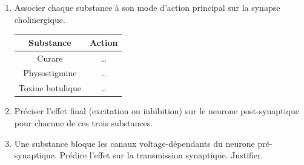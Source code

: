 \documentclass[11pt]{article}
\begin{document}
\begin{exercice}
\begin{enumerate}
    \item Associer chaque substance à son mode d'action principal sur la synapse cholinergique.
    \begin{center}
        \begin{tabular}{|c|c|}
        \hline
        \textbf{Substance} & \textbf{Action} \\
        \hline
        Curare & \ldots \\
        \hline
        Physostigmine & \ldots \\
        \hline
        Toxine botulique & \ldots \\
        \hline
        \end{tabular}
    \end{center}
    \item Préciser l'effet final (excitation ou inhibition) sur le neurone post-synaptique pour chacune de ces trois substances.
    \item Une substance bloque les canaux  voltage-dépendants du neurone pré-synaptique. Prédire l'effet sur la transmission synaptique. Justifier.
\end{enumerate}
\end{exercice}
\end{document}
